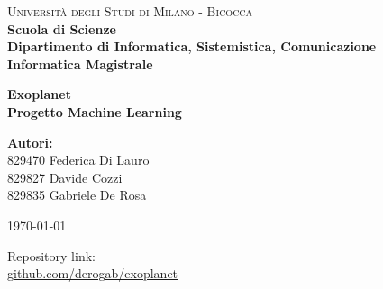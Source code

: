 \begin{titlepage}
    \noindent
    \begin{minipage}[t]{0.19\textwidth}
    \end{minipage}
    \begin{minipage}[t]{0.81\textwidth}
      {
        {\textsc{Università degli Studi di Milano - Bicocca}} \\
        \textbf{Scuola di Scienze} \\
        \textbf{Dipartimento di Informatica, Sistemistica, Comunicazione} \\
        \textbf{Informatica Magistrale}
        \par
      }
    \end{minipage}
    
    \vspace{15mm}
    
    \begin{center}
  
      \huge
      \textbf{Exoplanet} \\
      \LARGE
      \textbf{Progetto Machine Learning}
      
      
      \vspace{3cm}
      
      \normalsize
      \textbf{Autori:} \\
      \normalsize
      \vspace{0.15cm}
      829470 Federica Di Lauro \\
      \vspace{0.15cm}
      829827 Davide Cozzi \\
      \vspace{0.15cm}
      829835 Gabriele De Rosa \\
      
      
      \vspace{3cm}
      
      \today
      \vfill
      
      \small
      Repository link: \\
      \href{https://github.com/derogab/exoplanet}{github.com/derogab/exoplanet}
    \end{center}
  
  \end{titlepage}
  